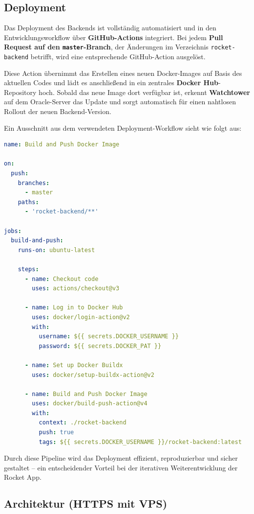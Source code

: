\documentclass[11pt,a4paper]{article}
\begin{document}
\subsection{Deployment}

Das Deployment des Backends ist vollständig automatisiert und in den Entwicklungsworkflow über \textbf{GitHub-Actions} integriert. Bei jedem \textbf{Pull Request auf den \texttt{master}-Branch}, der Änderungen im Verzeichnis \texttt{rocket-backend} betrifft, wird eine entsprechende GitHub-Action ausgelöst.

Diese Action übernimmt das Erstellen eines neuen Docker-Images auf Basis des aktuellen Codes und lädt es anschließend in ein zentrales \textbf{Docker Hub}-Repository hoch. Sobald das neue Image dort verfügbar ist, erkennt \textbf{Watchtower} auf dem Oracle-Server das Update und sorgt automatisch für einen nahtlosen Rollout der neuen Backend-Version.

Ein Ausschnitt aus dem verwendeten Deployment-Workflow sieht wie folgt aus:

\begin{lstlisting}[language=yaml, caption={GitHub Action zur automatisierten Bereitstellung}, label={lst:deployment}]
name: Build and Push Docker Image

on:
  push:
    branches:
      - master
    paths:
      - 'rocket-backend/**'

jobs:
  build-and-push:
    runs-on: ubuntu-latest

    steps:
      - name: Checkout code
        uses: actions/checkout@v3

      - name: Log in to Docker Hub
        uses: docker/login-action@v2
        with:
          username: ${{ secrets.DOCKER_USERNAME }}
          password: ${{ secrets.DOCKER_PAT }}

      - name: Set up Docker Buildx
        uses: docker/setup-buildx-action@v2

      - name: Build and Push Docker Image
        uses: docker/build-push-action@v4
        with:
          context: ./rocket-backend
          push: true
          tags: ${{ secrets.DOCKER_USERNAME }}/rocket-backend:latest
\end{lstlisting}

Durch diese Pipeline wird das Deployment effizient, reproduzierbar und sicher gestaltet – ein entscheidender Vorteil bei der iterativen Weiterentwicklung der Rocket App.


\subsection*{Architektur (HTTPS mit VPS)}
\end{document}
